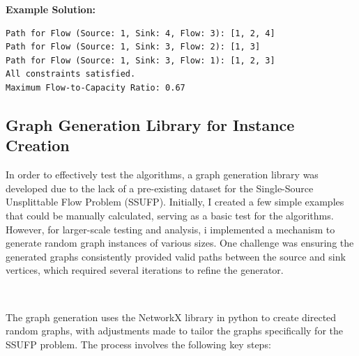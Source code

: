 \documentclass[a4paper,12pt]{article}
\begin{document}
\noindent \textbf{Example Solution:}
\begin{verbatim}
Path for Flow (Source: 1, Sink: 4, Flow: 3): [1, 2, 4]
Path for Flow (Source: 1, Sink: 3, Flow: 2): [1, 3]
Path for Flow (Source: 1, Sink: 3, Flow: 1): [1, 2, 3]
All constraints satisfied.
Maximum Flow-to-Capacity Ratio: 0.67
\end{verbatim}

\subsection{Graph Generation Library for Instance Creation}

In order to effectively test the algorithms, a graph generation library was developed due to the lack of a pre-existing dataset for the Single-Source Unsplittable Flow Problem (SSUFP). Initially, I created a few simple examples that could be manually calculated, serving as a basic test for the algorithms. However, for larger-scale testing and analysis, i implemented a mechanism to generate random graph instances of various sizes. One challenge was ensuring the generated graphs consistently provided valid paths between the source and sink vertices, which required several iterations to refine the generator.

\

\noindent The graph generation uses the NetworkX library in python to create directed random graphs, with adjustments made to tailor the graphs specifically for the SSUFP problem. The process involves the following key steps:
\end{document}

